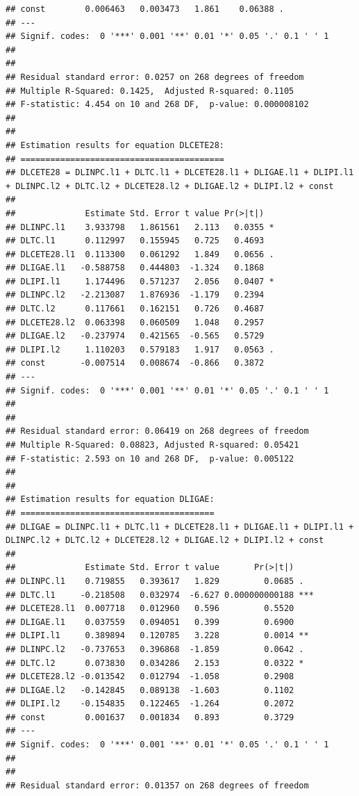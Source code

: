 \documentclass[
]{book}
\begin{document}
\begin{verbatim}
## const        0.006463   0.003473   1.861    0.06388 .  
## ---
## Signif. codes:  0 '***' 0.001 '**' 0.01 '*' 0.05 '.' 0.1 ' ' 1
## 
## 
## Residual standard error: 0.0257 on 268 degrees of freedom
## Multiple R-Squared: 0.1425,  Adjusted R-squared: 0.1105 
## F-statistic: 4.454 on 10 and 268 DF,  p-value: 0.000008102 
## 
## 
## Estimation results for equation DLCETE28: 
## ========================================= 
## DLCETE28 = DLINPC.l1 + DLTC.l1 + DLCETE28.l1 + DLIGAE.l1 + DLIPI.l1 + DLINPC.l2 + DLTC.l2 + DLCETE28.l2 + DLIGAE.l2 + DLIPI.l2 + const 
## 
##              Estimate Std. Error t value Pr(>|t|)  
## DLINPC.l1    3.933798   1.861561   2.113   0.0355 *
## DLTC.l1      0.112997   0.155945   0.725   0.4693  
## DLCETE28.l1  0.113300   0.061292   1.849   0.0656 .
## DLIGAE.l1   -0.588758   0.444803  -1.324   0.1868  
## DLIPI.l1     1.174496   0.571237   2.056   0.0407 *
## DLINPC.l2   -2.213087   1.876936  -1.179   0.2394  
## DLTC.l2      0.117661   0.162151   0.726   0.4687  
## DLCETE28.l2  0.063398   0.060509   1.048   0.2957  
## DLIGAE.l2   -0.237974   0.421565  -0.565   0.5729  
## DLIPI.l2     1.110203   0.579183   1.917   0.0563 .
## const       -0.007514   0.008674  -0.866   0.3872  
## ---
## Signif. codes:  0 '***' 0.001 '**' 0.01 '*' 0.05 '.' 0.1 ' ' 1
## 
## 
## Residual standard error: 0.06419 on 268 degrees of freedom
## Multiple R-Squared: 0.08823, Adjusted R-squared: 0.05421 
## F-statistic: 2.593 on 10 and 268 DF,  p-value: 0.005122 
## 
## 
## Estimation results for equation DLIGAE: 
## ======================================= 
## DLIGAE = DLINPC.l1 + DLTC.l1 + DLCETE28.l1 + DLIGAE.l1 + DLIPI.l1 + DLINPC.l2 + DLTC.l2 + DLCETE28.l2 + DLIGAE.l2 + DLIPI.l2 + const 
## 
##              Estimate Std. Error t value       Pr(>|t|)    
## DLINPC.l1    0.719855   0.393617   1.829         0.0685 .  
## DLTC.l1     -0.218508   0.032974  -6.627 0.000000000188 ***
## DLCETE28.l1  0.007718   0.012960   0.596         0.5520    
## DLIGAE.l1    0.037559   0.094051   0.399         0.6900    
## DLIPI.l1     0.389894   0.120785   3.228         0.0014 ** 
## DLINPC.l2   -0.737653   0.396868  -1.859         0.0642 .  
## DLTC.l2      0.073830   0.034286   2.153         0.0322 *  
## DLCETE28.l2 -0.013542   0.012794  -1.058         0.2908    
## DLIGAE.l2   -0.142845   0.089138  -1.603         0.1102    
## DLIPI.l2    -0.154835   0.122465  -1.264         0.2072    
## const        0.001637   0.001834   0.893         0.3729    
## ---
## Signif. codes:  0 '***' 0.001 '**' 0.01 '*' 0.05 '.' 0.1 ' ' 1
## 
## 
## Residual standard error: 0.01357 on 268 degrees of freedom

\end{verbatim}
\end{document}
